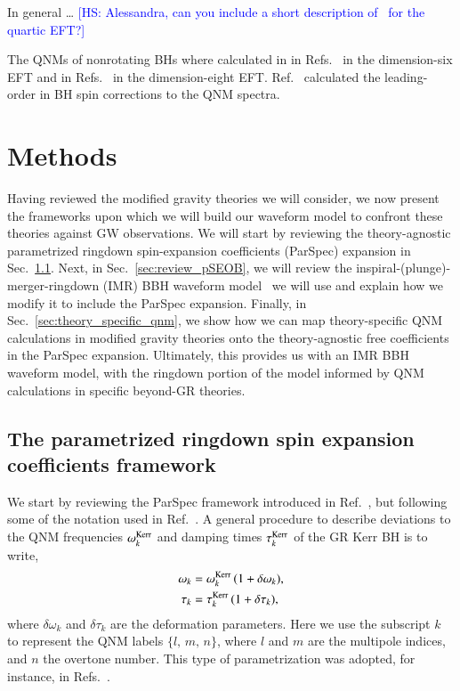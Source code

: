 \documentclass[twocolumn,
               prd,
               aps,
               superscriptaddress,
               tightenlines,
               nofootinbib,
               eqsecnum,
               amsfonts,
               amsmath,
               longbibliography]{revtex4-1}
\newcommand{\hs}[1]{{\textcolor{blue}{{[HS: #1]}} }}
\begin{document}
In general \dots
%
\hs{Alessandra, can you include a short description of~\cite{Sennett:2019bpc} for the quartic EFT?}

The QNMs of nonrotating BHs where calculated in in Refs.~\cite{deRham:2020ejn,Cano:2020cao} in the dimension-six EFT
and in Refs.~\cite{Cardoso:2018ptl,Cano:2020cao} in the dimension-eight EFT.
%
Ref.~\cite{Cano:2020cao} calculated the leading-order in BH spin corrections to the QNM spectra.

\section{Methods}
\label{sec:method}

Having reviewed the modified gravity theories we will consider, we now present
the frameworks upon which we will build our waveform model to confront these
theories against GW observations.
%
We will start by reviewing the theory-agnostic parametrized ringdown
spin-expansion coefficients (ParSpec) expansion in Sec.~\ref{sec:review_parspec}.
%
Next, in Sec.~\ref{sec:review_pSEOB}, we will review the
inspiral-(plunge)-merger-ringdown (IMR) BBH waveform
model~\cite{Brito:2018rfr,Ghosh:2021mrv} we will use and explain how we modify
it to include the ParSpec expansion.
%
Finally, in Sec.~\ref{sec:theory_specific_qnm}, we show how we can map
theory-specific QNM calculations in modified gravity theories onto the
theory-agnostic free coefficients in the ParSpec expansion.
%
Ultimately, this provides us with an IMR BBH waveform model, with the ringdown
portion of the model informed by QNM calculations in specific beyond-GR
theories.

\subsection{The parametrized ringdown spin expansion coefficients framework}
\label{sec:review_parspec}

We start by reviewing the ParSpec
framework introduced in Ref.~\cite{Maselli:2019mjd}, but following
some of the notation used in Ref.~\cite{Carullo:2021dui}.
%
A general procedure to describe deviations to the QNM frequencies $\omega_{k}^{\rm Kerr}$ and
damping times $\tau_{k}^{\rm Kerr}$ of the GR Kerr BH is to write,
%
\begin{subequations}
\label{eq:general_deviation}
\begin{align}
\omega_{k} &= \omega^{\rm Kerr}_{k} \, (1 + \delta \omega_{k}), \\
\tau_{k}   &= \tau^{\rm Kerr}_{k}   \, (1 + \delta \tau_{k}),
\end{align}
\end{subequations}
%
where $\delta\omega_{k}$ and $\delta\tau_{k}$ are the deformation parameters.
%
Here we use the subscript $k$ to represent the QNM labels $\{l,\, m,\, n\}$,
where $l$ and $m$ are the multipole indices, and $n$ the overtone number.
%
This type of parametrization was adopted, for instance, in Refs.~\cite{Gossan:2011ha,Meidam:2014jpa,Carullo:2018sfu}.
\end{document}
